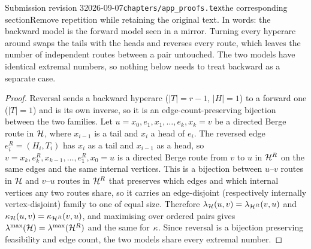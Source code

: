 \begin{offcut}{Submission revision 3}{2026-09-07}{\texttt{chapters/app\_proofs.tex}}{the corresponding section}{Remove repetition while retaining the original text.}
In words: the backward model is the forward model seen in a mirror. Turning every hyperarc around swaps the tails with the heads and reverses every route, which leaves the number of independent routes between a pair untouched. The two models have identical extremal numbers, so nothing below needs to treat backward as a separate case.

\begin{proof}
Reversal sends a backward hyperarc ($|T| = r-1$, $|H| = 1$) to a forward one
($|T| = 1$) and is its own inverse, so it is an edge-count-preserving bijection
between the two families. Let $u = x_0, e_1, x_1, \dots, e_k, x_k = v$ be a directed Berge
route in $\mathcal{H}$, where $x_{i-1}$ is a tail and $x_i$ a head of $e_i$. The reversed
edge $e_i^{R} = (H_i, T_i)$ has $x_i$ as a tail and $x_{i-1}$ as a head, so
$v = x_k, e_k^{R}, x_{k-1}, \dots, e_1^{R}, x_0 = u$ is a directed Berge route
from $v$ to $u$ in $\mathcal{H}^{R}$ on the same edges and the same internal vertices. This
is a bijection between $u$--$v$ routes in $\mathcal{H}$ and $v$--$u$ routes in $\mathcal{H}^{R}$
that preserves which edges and which internal vertices any two routes share, so it
carries an edge-disjoint (respectively internally vertex-disjoint) family to one of
equal size. Therefore $\lambda_{\mathcal{H}}(u, v) = \lambda_{\mathcal{H}^{R}}(v, u)$ and
$\kappa_{\mathcal{H}}(u, v) = \kappa_{\mathcal{H}^{R}}(v, u)$, and maximising over ordered pairs gives
$\lambda^{\max}(\mathcal{H}) = \lambda^{\max}(\mathcal{H}^{R})$ and the same for $\kappa$. Since reversal is
a bijection preserving feasibility and edge count, the two models share every
extremal number.
\end{proof}


\end{offcut}

